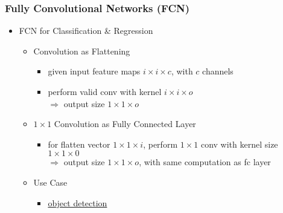 \subsubsection{Fully Convolutional Networks (FCN)} \label{DL_Arch_FCN}
\begin{itemize}
\item FCN for Classification \& Regression
	\begin{itemize}
	\item Convolution as Flattening
		\begin{itemize}
		\item given input feature maps $i\times i\times c$, with $c$ channels
		\item perform valid conv with kernel $i\times i \times o$ \\ 
		$\Rightarrow$ output size $1\times1 \times o$
		\end{itemize}
	\item $1\times1$ Convolution as Fully Connected Layer
		\begin{itemize}
		\item for flatten vector $1\times1\times i$, perform $1\times1$ conv with kernel size $1\times1\times 0$ \\
		$\Rightarrow$ output size $1\times1\times o$, with same computation as fc layer
		\end{itemize}
	\item Use Case
		\begin{itemize}
		\item \hyperref[DL_CV_Objdet]{object detection}
		\end{itemize}
	\end{itemize}
\end{itemize}

